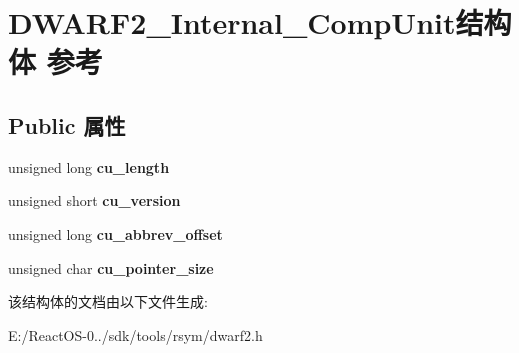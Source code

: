 \hypertarget{struct_d_w_a_r_f2___internal___comp_unit}{}\section{D\+W\+A\+R\+F2\+\_\+\+Internal\+\_\+\+Comp\+Unit结构体 参考}
\label{struct_d_w_a_r_f2___internal___comp_unit}
\subsection*{Public 属性}
\begin{DoxyCompactItemize}
\item 
\mbox{\label{struct_d_w_a_r_f2___internal___comp_unit_a4fbb968d04f55386785ef06dd9121c82}} 
unsigned long {\bfseries cu\+\_\+length}
\item 
\mbox{\label{struct_d_w_a_r_f2___internal___comp_unit_a31cdea3b0599c8b90757e9d06c1cc989}} 
unsigned short {\bfseries cu\+\_\+version}
\item 
\mbox{\label{struct_d_w_a_r_f2___internal___comp_unit_a51886c72494064bc1f5ff5a95c1ff925}} 
unsigned long {\bfseries cu\+\_\+abbrev\+\_\+offset}
\item 
\mbox{\label{struct_d_w_a_r_f2___internal___comp_unit_acc4c7a89f02587aaaac03152be92afbc}} 
unsigned char {\bfseries cu\+\_\+pointer\+\_\+size}
\end{DoxyCompactItemize}


该结构体的文档由以下文件生成\+:\begin{DoxyCompactItemize}
\item 
E\+:/\+React\+O\+S-\/0../sdk/tools/rsym/dwarf2.\+h\end{DoxyCompactItemize}
